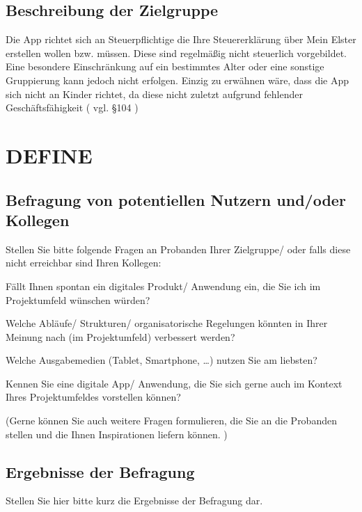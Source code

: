 \subsection{Beschreibung der Zielgruppe}\label{Beschreibung der Zielgruppe}
Die App richtet sich an Steuerpflichtige die Ihre Steuererklärung über \grq{}Mein Elster\grq{} erstellen wollen bzw. müssen.
Diese sind regelmäßig nicht steuerlich vorgebildet. Eine besondere Einschränkung auf ein bestimmtes Alter oder eine sonstige Gruppierung kann jedoch nicht erfolgen. Einzig zu erwähnen wäre, dass die App sich nicht an Kinder richtet, da diese nicht zuletzt aufgrund fehlender Geschäftsfähigkeit ( vgl. §104 \cite{bgb})


\section{DEFINE}\label{DEFINE}


\subsection{Befragung von potentiellen Nutzern und/oder Kollegen}\label{Befragung von potentiellen Nutzern und/oder Kollegen}
Stellen Sie bitte folgende Fragen an Probanden Ihrer Zielgruppe/ oder falls diese nicht erreichbar sind Ihren Kollegen:

Fällt Ihnen spontan ein digitales Produkt/ Anwendung ein, die Sie ich im {Projektumfeld} wünschen würden?

Welche Abläufe/ Strukturen/ organisatorische Regelungen könnten in Ihrer Meinung nach (im Projektumfeld) verbessert werden?

Welche Ausgabemedien (Tablet, Smartphone, …) nutzen Sie am liebsten?

Kennen Sie eine digitale App/ Anwendung, die Sie sich gerne auch im Kontext {Ihres Projektumfeldes} vorstellen können?

(Gerne können Sie auch weitere Fragen formulieren, die Sie an die Probanden stellen und die Ihnen Inspirationen liefern können. )


\subsection{Ergebnisse der Befragung}\label{Ergebnisse der Befragung}
Stellen Sie hier bitte kurz die Ergebnisse der Befragung dar.


